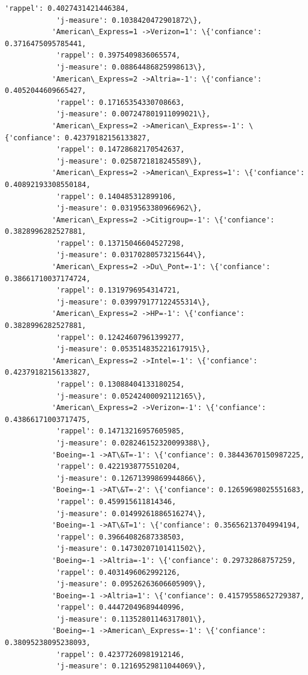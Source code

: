\documentclass[11pt]{article}
\begin{document}
\begin{Verbatim}[commandchars=\\\{\}]
            'rappel': 0.4027431421446384,
            'j-measure': 0.1038420472901872\},
           'American\_Express=1 ->Verizon=1': \{'confiance': 0.3716475095785441,
            'rappel': 0.3975409836065574,
            'j-measure': 0.08864486825998613\},
           'American\_Express=2 ->Altria=-1': \{'confiance': 0.4052044609665427,
            'rappel': 0.17165354330708663,
            'j-measure': 0.007247801911099021\},
           'American\_Express=2 ->American\_Express=-1': \{'confiance': 0.42379182156133827,
            'rappel': 0.14728682170542637,
            'j-measure': 0.0258721818245589\},
           'American\_Express=2 ->American\_Express=1': \{'confiance': 0.40892193308550184,
            'rappel': 0.140485312899106,
            'j-measure': 0.0319563380966962\},
           'American\_Express=2 ->Citigroup=-1': \{'confiance': 0.3828996282527881,
            'rappel': 0.13715046604527298,
            'j-measure': 0.03170280573215644\},
           'American\_Express=2 ->Du\_Pont=-1': \{'confiance': 0.38661710037174724,
            'rappel': 0.1319796954314721,
            'j-measure': 0.039979177122455314\},
           'American\_Express=2 ->HP=-1': \{'confiance': 0.3828996282527881,
            'rappel': 0.12424607961399277,
            'j-measure': 0.053514835221617915\},
           'American\_Express=2 ->Intel=-1': \{'confiance': 0.42379182156133827,
            'rappel': 0.13088404133180254,
            'j-measure': 0.05242400092112165\},
           'American\_Express=2 ->Verizon=-1': \{'confiance': 0.43866171003717475,
            'rappel': 0.14713216957605985,
            'j-measure': 0.028246152320099388\},
           'Boeing=-1 ->AT\&T=-1': \{'confiance': 0.38443670150987225,
            'rappel': 0.4221938775510204,
            'j-measure': 0.12671399869944866\},
           'Boeing=-1 ->AT\&T=-2': \{'confiance': 0.12659698025551683,
            'rappel': 0.459915611814346,
            'j-measure': 0.01499261886516274\},
           'Boeing=-1 ->AT\&T=1': \{'confiance': 0.35656213704994194,
            'rappel': 0.39664082687338503,
            'j-measure': 0.14730207101411502\},
           'Boeing=-1 ->Altria=-1': \{'confiance': 0.29732868757259,
            'rappel': 0.4031496062992126,
            'j-measure': 0.09526263606605909\},
           'Boeing=-1 ->Altria=1': \{'confiance': 0.41579558652729387,
            'rappel': 0.44472049689440996,
            'j-measure': 0.11352801146317801\},
           'Boeing=-1 ->American\_Express=-1': \{'confiance': 0.38095238095238093,
            'rappel': 0.42377260981912146,
            'j-measure': 0.12169529811044069\},

\end{Verbatim}
\end{document}
